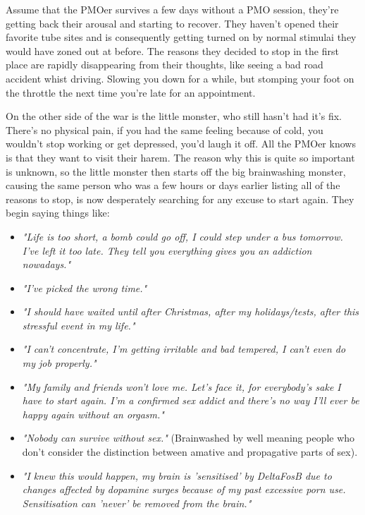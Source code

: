 \documentclass[easypeasy.tex]{subfiles}
\begin{document}
Assume that the PMOer survives a few days without a PMO session, they're getting back their arousal and starting to recover. They haven't opened their favorite tube sites and is consequently getting turned on by normal stimulai they would have zoned out at before. The reasons they decided to stop in the first place are rapidly disappearing from their thoughts, like seeing a bad road accident whist driving. Slowing you down for a while, but stomping your foot on the throttle the next time you're late for an appointment.

On the other side of the war is the little monster, who still hasn't had it's fix. There's no physical pain, if you had the same feeling because of cold, you wouldn't stop working or get depressed, you'd laugh it off. All the PMOer knows is that they want to visit their harem. The reason why this is quite so important is unknown, so the little monster then starts off the big brainwashing monster, causing the same person who was a few hours or days earlier listing all of the reasons to stop, is now desperately searching for any excuse to start again. They begin saying things like:
\begin{itemize}

  \item \textit{"Life is too short, a bomb could go off, I could step under a bus tomorrow. I've left it too late. They tell you everything gives you an addiction nowadays."}

  \item \textit{"I've picked the wrong time."}

  \item \textit{"I should have waited until after Christmas, after my holidays/tests, after this stressful event in my life."}

  \item \textit{"I can't concentrate, I'm getting irritable and bad tempered, I can't even do my job properly."}

  \item \textit{"My family and friends won't love me. Let's face it, for everybody's sake I have to start again. I'm a confirmed sex addict and there's no way I'll ever be happy again without an orgasm."}

  \item \textit{"Nobody can survive without sex."} (Brainwashed by well meaning people who don't consider the distinction between amative and propagative parts of sex).

  \item \textit{"I knew this would happen, my brain is 'sensitised' by DeltaFosB due to changes affected by dopamine surges because of my past excessive porn use. Sensitisation can 'never' be removed from the brain."}
\end{itemize}
\end{document}
